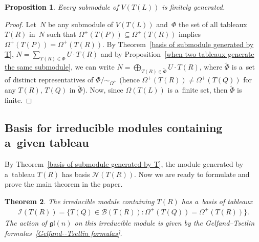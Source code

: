 \documentclass[11pt]{article}
\numberwithin{equation}{section}
\newtheorem{Theorem}{Theorem}[section]
\newtheorem{Proposition}[Theorem]{Proposition}
{ \theoremstyle{definition}
\newtheorem{Definition}[Theorem]{Definition}
\newtheorem{Note}[Theorem]{Note}
\newtheorem{Example}[Theorem]{Example}
\newtheorem{Notation}[Theorem]{Notation}
\newtheorem{Remark}[Theorem]{Remark} }
\begin{document}
\begin{Proposition}
Every submodule of $V(T(L))$ is finitely generated.
\end{Proposition}
\begin{proof}
Let~$N$ be any submodule of $V(T(L))$ and~$\Phi$ the set of all tableaux $T(R)$ in~$N$ such that
$\Omega^{+}(T(P))\subseteq\Omega^{+}(T(R))$ implies $\Omega^{+}(T(P))=\Omega^{+}(T(R))$.
By Theorem~\ref{basis of submodule generated by T}, $N=\sum\limits_{T(R)\in\Phi} U\cdot T(R)$ and by
Proposition~\ref{when two tableaux generate the same submodule}, we can write $N=\bigoplus_{T(R)\in\tilde{\Phi}} U\cdot
T(R)$, where $\tilde{\Phi}$ is a~set of distinct representatives of $\Phi/\sim_{\Omega^+}$ (hence
$\Omega^{+}(T(R))\neq\Omega^{+}(T(Q))$ for any $T(R)$, $T(Q)$ in $\tilde{\Phi}$).
Now, since $\Omega(T(L))$ is a~f\/inite set, then $\tilde{\Phi}$ is f\/inite.
\end{proof}

\subsection{Basis for irreducible modules containing a~given tableau}
By Theorem~\ref{basis of submodule generated by T}, the module generated by a~tableau $T(R)$ has basis
$\mathcal{N}(T(R))$.
\setcounter{section}{6}
\setcounter{subsection}{2}
\setcounter{subsubsection}{0}
\setcounter{Theorem}{13}
\setcounter{equation}{3}
Now we are ready to formulate and prove the main theorem in the paper.

\begin{Theorem}
\label{characterization of irreducible basis}
The irreducible module containing $T(R)$ has a~basis of tableaux
\begin{gather*}
\mathcal{I}(T(R))=\big\{T(Q)\in\mathcal{B}(T(R)): \Omega^{+}(T(Q))=\Omega^{+}(T(R))\big\}.
\end{gather*}
The action of $\mathfrak{gl}(n)$ on this irreducible module is given by the Gelfand--Tsetlin
formulas~\eqref{Gelfand--Tsetlin formulas}.
\setcounter{section}{6}
\setcounter{subsection}{2}
\setcounter{subsubsection}{0}
\setcounter{Theorem}{14}
\setcounter{equation}{3}
\end{Theorem}
\end{document}
